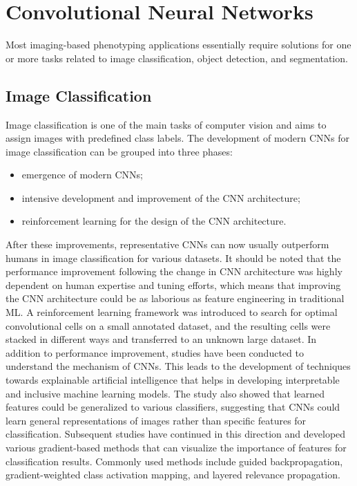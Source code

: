 \section{Convolutional Neural Networks}
Most imaging-based phenotyping applications essentially require solutions for one or more tasks related to image classification, object detection, and segmentation.

\subsection{Image Classification}
Image classification is one of the main tasks of computer vision and aims to assign images with predefined class labels.
The development of modern CNNs for image classification can be grouped into three phases:
\begin{itemize}
    \item emergence of modern CNNs;
    \item intensive development and improvement of the CNN architecture;
    \item reinforcement learning for the design of the CNN architecture.
\end{itemize}
After these improvements, representative CNNs can now usually outperform humans in image classification for various datasets. It should be noted that the performance
improvement following the change in CNN architecture was highly dependent on human expertise and tuning efforts, which means that improving the CNN architecture
could be as laborious as feature engineering in traditional ML. A reinforcement learning framework was introduced to search for optimal convolutional cells on a small
annotated dataset, and the resulting cells were stacked in different ways and transferred to an unknown large dataset. In addition to performance improvement, studies
have been conducted to understand the mechanism of CNNs. This leads to the development of techniques towards explainable artificial intelligence that helps in developing
interpretable and inclusive machine learning models. The study also showed that learned features could be generalized to various classifiers, suggesting that CNNs could
learn general representations of images rather than specific features for classification. Subsequent studies have continued in this direction and developed various
gradient-based methods that can visualize the importance of features for classification results. Commonly used methods include guided backpropagation, gradient-weighted
class activation mapping, and layered relevance propagation.


